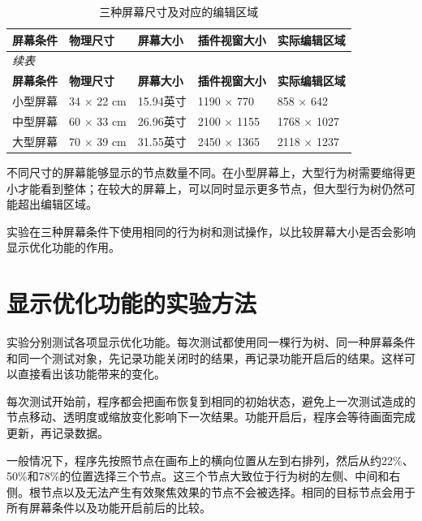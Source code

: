 \documentclass[11pt,a4paper,oneside,extrafontsizes]{memoir}
\begin{document}
\begin{center}

\begin{longtable}{@{}p{} p{} p{} p{} p{}@{}}
\caption{三种屏幕尺寸及对应的编辑区域}\label{tab:screen-configs}\\
\toprule
\textbf{屏幕条件} & \textbf{物理尺寸} & \textbf{屏幕大小} & \textbf{插件视窗大小} & \textbf{实际编辑区域} \\
\midrule
\endfirsthead
\multicolumn{5}{l}{\itshape 续表}\\
\toprule
\textbf{屏幕条件} & \textbf{物理尺寸} & \textbf{屏幕大小} & \textbf{插件视窗大小} & \textbf{实际编辑区域} \\
\midrule
\endhead
小型屏幕 & 34 × 22 cm & 15.94英寸 & 1190 × 770 & 858 × 642 \\
中型屏幕 & 60 × 33 cm & 26.96英寸 & 2100 × 1155 & 1768 × 1027 \\
大型屏幕 & 70 × 39 cm & 31.55英寸 & 2450 × 1365 & 2118 × 1237 \\
\bottomrule
\end{longtable}
\end{center}

不同尺寸的屏幕能够显示的节点数量不同。在小型屏幕上，大型行为树需要缩得更小才能看到整体；在较大的屏幕上，可以同时显示更多节点，但大型行为树仍然可能超出编辑区域。

实验在三种屏幕条件下使用相同的行为树和测试操作，以比较屏幕大小是否会影响显示优化功能的作用。

\section{显示优化功能的实验方法}

实验分别测试各项显示优化功能。每次测试都使用同一棵行为树、同一种屏幕条件和同一个测试对象，先记录功能关闭时的结果，再记录功能开启后的结果。这样可以直接看出该功能带来的变化。

每次测试开始前，程序都会把画布恢复到相同的初始状态，避免上一次测试造成的节点移动、透明度或缩放变化影响下一次结果。功能开启后，程序会等待画面完成更新，再记录数据。

一般情况下，程序先按照节点在画布上的横向位置从左到右排列，然后从约22\%、50\%和78\%的位置选择三个节点。这三个节点大致位于行为树的左侧、中间和右侧。根节点以及无法产生有效聚焦效果的节点不会被选择。相同的目标节点会用于所有屏幕条件以及功能开启前后的比较。
\end{document}
